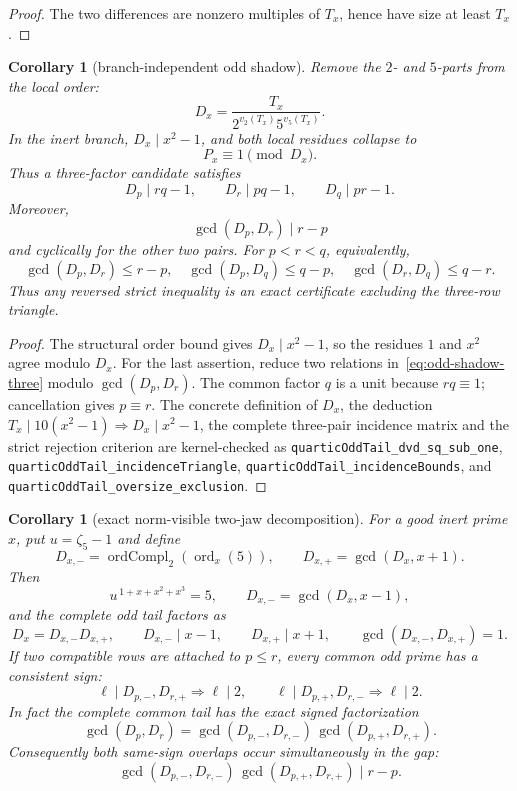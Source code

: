 \documentclass[11pt]{amsart}
\newtheorem{corollary}[theorem]{Corollary}
\theoremstyle{definition}
\theoremstyle{remark}
\begin{document}
\begin{proof}
The two differences are nonzero multiples of \(T_x\), hence have size at
least \(T_x\).
\end{proof}

\begin{corollary}[branch-independent odd shadow]\label{cor:odd-shadow}
Remove the \(2\)- and \(5\)-parts from the local order:
\[
D_x=\frac{T_x}{2^{v_2(T_x)}5^{v_5(T_x)}}.
\]
In the inert branch, \(D_x\mid x^2-1\), and both local residues collapse
to
\[
P_x\equiv1\pmod{D_x}.
\]
Thus a three-factor candidate satisfies
\[
\boxed{
D_p\mid rq-1,\qquad D_r\mid pq-1,\qquad D_q\mid pr-1.}
\tag{7.1}\label{eq:odd-shadow-three}
\]
Moreover,
\[
\gcd(D_p,D_r)\mid r-p
\]
and cyclically for the other two pairs.
For \(p<r<q\), equivalently,
\[
\boxed{
\gcd(D_p,D_r)\le r-p,\quad
\gcd(D_p,D_q)\le q-p,\quad
\gcd(D_r,D_q)\le q-r.}
\]
Thus any reversed strict inequality is an exact certificate excluding the
three-row triangle.
\end{corollary}

\begin{proof}
The structural order bound gives \(D_x\mid x^2-1\), so the residues \(1\)
and \(x^2\) agree modulo \(D_x\).  For the last assertion, reduce two
relations in~\eqref{eq:odd-shadow-three} modulo
\(\gcd(D_p,D_r)\).  The common factor \(q\) is
a unit because \(rq\equiv1\); cancellation gives \(p\equiv r\).
The concrete definition of \(D_x\), the deduction
\(T_x\mid10(x^2-1)\Rightarrow D_x\mid x^2-1\), the complete three-pair
incidence matrix and the strict rejection criterion are kernel-checked as
\texttt{quarticOddTail\_\allowbreak dvd\_\allowbreak sq\_\allowbreak sub\_\allowbreak one},
\texttt{quarticOddTail\_\allowbreak incidenceTriangle},
\texttt{quarticOddTail\_\allowbreak incidenceBounds}, and
\texttt{quarticOddTail\_\allowbreak oversize\_\allowbreak exclusion}.
\end{proof}

\begin{corollary}[exact norm-visible two-jaw decomposition]
\label{cor:norm-jaws}
For a good inert prime \(x\), put \(u=\zeta_5-1\) and define
\[
D_{x,-}=\operatorname{ordCompl}_2(\operatorname{ord}_x(5)),
\qquad
D_{x,+}=\gcd(D_x,x+1).
\]
Then
\[
\boxed{
u^{\,1+x+x^2+x^3}=5,\qquad
D_{x,-}=\gcd(D_x,x-1),}
\]
and the complete odd tail factors as
\[
\boxed{
D_x=D_{x,-}D_{x,+},\qquad
D_{x,-}\mid x-1,\qquad
D_{x,+}\mid x+1,\qquad
\gcd(D_{x,-},D_{x,+})=1.}
\]
If two compatible rows are attached to \(p\le r\), every common odd
prime has a consistent sign:
\[
\ell\mid D_{p,-},D_{r,+}\Longrightarrow\ell\mid2,
\qquad
\ell\mid D_{p,+},D_{r,-}\Longrightarrow\ell\mid2.
\]
In fact the complete common tail has the exact signed factorization
\[
\boxed{
\gcd(D_p,D_r)=
\gcd(D_{p,-},D_{r,-})\,
\gcd(D_{p,+},D_{r,+}).}
\]
Consequently both same-sign overlaps occur simultaneously in the gap:
\[
\gcd(D_{p,-},D_{r,-})\,
\gcd(D_{p,+},D_{r,+})\mid r-p.
\]
\end{corollary}
\end{document}
